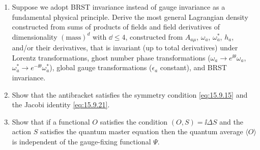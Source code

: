 \begin{enumerate}
  \item Suppose we adopt BRST invariance instead of gauge invariance as a fundamental physical principle. Derive the most general Lagrangian density constructed from sums of products of fields and field derivatives of dimensionality $(\text{mass})^d$ with $\dd\leq4$, constructed from $A_{a\mu}$, $\omega_a$, $\omega_a^*$, $h_a$, and/or their derivatives, that is invariant (up to total derivatives) under Lorentz transformations, ghost number phase transformations ($\omega_a\longrightarrow e^{\ii\theta}\omega_a$, $\omega_a^*\longrightarrow e^{-\ii\theta}\omega_a^*$), global gauge transformations ($\epsilon_a$ constant), and BRST invariance.

  \item Show that the antibracket satisfies the symmetry condition \eqref{eq:15.9.15} and the Jacobi identity \eqref{eq:15.9.21}.

  \item Show that if a functional $O$ satisfies the condition $(O,S)=\ii\Delta S$ and the action $S$ satisfies the quantum master equation then the quantum average $\langle O\rangle$ is independent of the gauge-fixing functional $\Psi$.
\end{enumerate}


